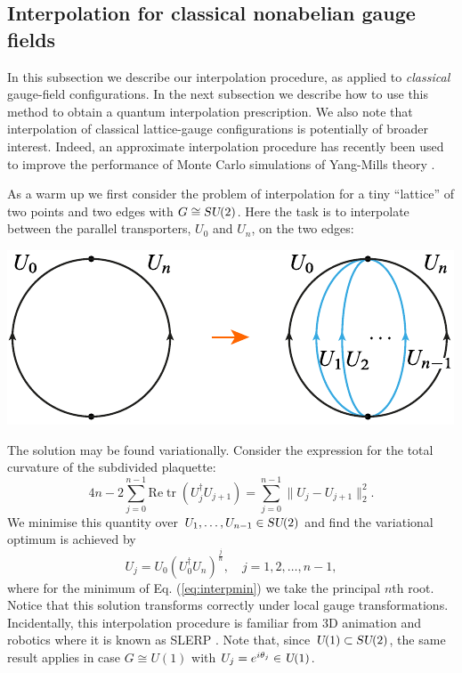 \documentclass[twocolumn,lengthcheck,superscriptaddress]{revtex4-1}
\newcommand{\tr}{\operatorname{tr}}
\def\su2{\textsl{SU}(2)}
\def\uone{\textsl{U}(1)}
\theoremstyle{definition}
\theoremstyle{remark}
\begin{document}
\subsection{Interpolation for classical nonabelian gauge fields}
In this subsection we describe our interpolation procedure, as applied to \emph{classical} gauge-field configurations. In the next subsection we describe how to use this method to obtain a quantum interpolation prescription. We also note that interpolation of classical lattice-gauge configurations is potentially of broader interest. Indeed, an approximate interpolation procedure has recently been used to improve the performance of Monte Carlo simulations of Yang-Mills theory \cite{endres:2015}.

As a warm up we first consider the problem of interpolation for a tiny ``lattice'' of two points and two edges with $G \cong \su2$. Here the task is to interpolate between the parallel transporters, $U_0$ and $U_n$, on the two edges:
\begin{center}
	\includegraphics{facemsection.pdf}
\end{center}
The solution may be  found variationally. Consider the expression for the total curvature of the subdivided plaquette:
\begin{equation} \label{eq:interpmin}
 4n- 2 \sum_{j=0}^{n-1}  \text{Re}\tr(U_j^\dag U_{j+1}) 
	=  \sum_{j=0}^{n-1} \|U_j-U_{j+1}\|_2^2 .
\end{equation}
We minimise this quantity over ${U_1, \ldots, U_{n-1} \in \su2}$ and find the variational optimum is achieved by
\begin{equation} \label{eq:slerp}
	U_j = U_0 (U_0^\dag U_{n})^{\frac{j}{n}}, \quad j = 1, 2, \ldots, n-1,
\end{equation}
where for the minimum of Eq. (\ref{eq:interpmin}) we take the principal $n$th root.
Notice that this solution transforms correctly under local gauge transformations. Incidentally, this interpolation procedure is familiar from 3D animation and robotics where it is known as SLERP \cite{shoemake:1985a}. 
Note that, since $\uone \subset \su2$, the same result applies in case $G \cong U(1)$ with $U_j = e^{i\theta_j} \in \uone$. 
\end{document}
